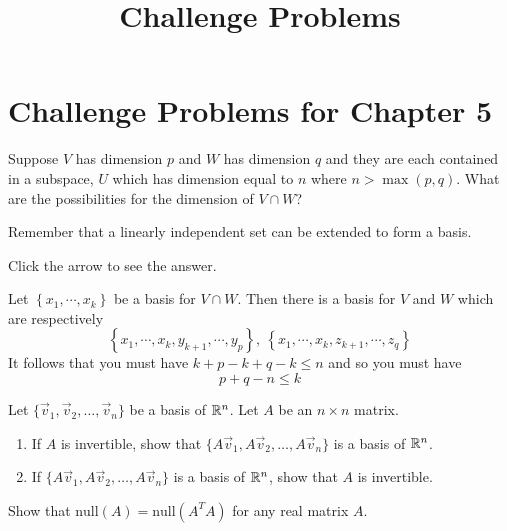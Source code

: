 \documentclass{ximera}
\title{Challenge Problems} \license{CC BY-NC-SA 4.0}
\begin{document}
\begin{abstract}
\end{abstract}
\maketitle

\section*{Challenge Problems for Chapter 5}

\begin{problem}\label{prb:5.29} Suppose $V$ has dimension $p$ and $W$ has dimension $q$ and they
are each contained in a subspace, $U$ which has dimension equal to $n$ where
$n>\max \left( p,q\right).$ What are the possibilities for the dimension of
$V\cap W$? 

\begin{hint}
Remember that a linearly independent set can be extended to form a basis.
\end{hint}

Click the arrow to see the answer.
\begin{expandable}{}{}
Let $\left\{ x_{1},\cdots ,x_{k}\right\} $ be a
basis for $V\cap W.$ Then there is a basis for $V$ and $W$ which are
respectively
\[
\left\{ x_{1},\cdots ,x_{k},y_{k+1},\cdots ,y_{p}\right\} ,\ \left\{
x_{1},\cdots ,x_{k},z_{k+1},\cdots ,z_{q}\right\}
\]
It follows that you must have $k+p-k+q-k\leq n$ and so you must have
\[
p+q-n\leq k
\]
\end{expandable}
\end{problem}

\begin{problem}\label{prob:nich6.2}
    Let $\{\vec{v}_1, \vec{v}_2, \dots, \vec{v}_n\}$ be a basis of $\mathbb{R}^n$.  Let $A$ be an $n\times n$ matrix.
    \begin{enumerate}
        \item If $A$ is invertible, show that $\{A\vec{v}_1, A\vec{v}_2, \dots, A\vec{v}_n\}$ is a basis of $\mathbb{R}^n$.
        \item If $\{A\vec{v}_1, A\vec{v}_2, \dots, A\vec{v}_n\}$ is a basis of $\mathbb{R}^n$, show that $A$ is invertible.
    \end{enumerate}
\end{problem}

\begin{problem}\label{prob:nich6.4}
    Show that $\text{null}(A)=\text{null}(A^TA)$ for any real matrix $A$. 
\end{problem}
\end{document}
